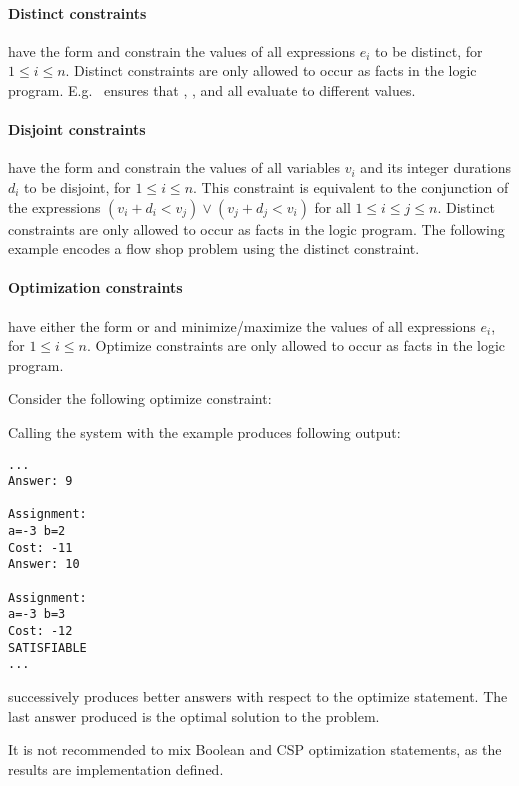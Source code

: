 \paragraph{Distinct constraints} have the form
 and constrain the values of all expressions
$e_i$ to be distinct, for $1\leq i\leq n$.
Distinct constraints are only allowed to occur as facts in the logic program.
E.g.~ ensures that , , and  all evaluate to different values.

\paragraph{Disjoint constraints} have the form
 and constrain the values of all variables
$v_i$ and its integer durations $d_i$ to be disjoint, for $1\leq i\leq n$.
This constraint is equivalent to the conjunction of the expressions $(v_i+d_i < v_j) \lor (v_j+d_j < v_i)$ for all $1\leq i \leq j \leq n$.
Distinct constraints are only allowed to occur as facts in the logic program.
The following example encodes a flow shop problem using the distinct constraint.



\paragraph{Optimization constraints} have either the form
 or
and minimize/maximize the values of all expressions $e_i$,
for $1\leq i\leq n$.
Optimize constraints are only allowed to occur as facts in the logic program.
\begin{example}\label{ex:lp:csp1}
Consider the following optimize constraint:

Calling the system with the example produces following output:
\begin{lstlisting}[numbers=none]
...
Answer: 9

Assignment:
a=-3 b=2
Cost: -11
Answer: 10

Assignment:
a=-3 b=3
Cost: -12
SATISFIABLE
...
\end{lstlisting}
\clingcon{} successively produces better answers with respect to the optimize statement.
The last answer produced is the optimal solution to the problem.
\end{example}
It is not recommended to mix Boolean and CSP optimization statements, as the results are implementation defined.


